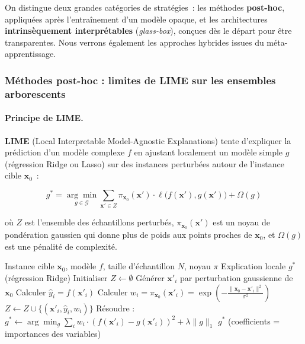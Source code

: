 On distingue deux grandes catégories de stratégies~: les méthodes \textbf{post-hoc},
appliquées après l'entraînement d'un modèle opaque, et les architectures
\textbf{intrinsèquement interprétables} (\textit{glass-box}), conçues dès le départ pour
être transparentes. Nous verrons également les approches hybrides issues du méta-apprentissage.

\subsubsection{Méthodes post-hoc : limites de LIME sur les ensembles arborescents}

\paragraph{Principe de LIME.}
\textbf{LIME} (Local Interpretable Model-Agnostic Explanations) tente d'expliquer la
prédiction d'un modèle complexe $f$ en ajustant localement un modèle simple $g$
(régression Ridge ou Lasso) sur des instances perturbées autour de l'instance cible $\mathbf{x}_0$~:

\begin{equation}
  g^* = \underset{g \in \mathcal{G}}{\arg\min}
  \sum_{\mathbf{x}' \in Z} \pi_{\mathbf{x}_0}(\mathbf{x}') \cdot \ell\bigl(f(\mathbf{x}'), g(\mathbf{x}')\bigr)
  + \Omega(g)
  \label{eq:lime}
\end{equation}

où $Z$ est l'ensemble des échantillons perturbés, $\pi_{\mathbf{x}_0}(\mathbf{x}')$ est un noyau
de pondération gaussien qui donne plus de poids aux points proches de $\mathbf{x}_0$,
et $\Omega(g)$ est une pénalité de complexité.

\begin{algorithm}[H]
\caption{LIME appliqué à un classifieur d'ensemble $f$}
\begin{algorithmic}[1]
\Require Instance cible $\mathbf{x}_0$, modèle $f$, taille d'échantillon $N$, noyau $\pi$
\Ensure Explication locale $g^*$ (régression Ridge)
\State Initialiser $Z \leftarrow \emptyset$
    \State Générer $\mathbf{x}'_i$ par perturbation gaussienne de $\mathbf{x}_0$
    \State Calculer $\hat{y}_i = f(\mathbf{x}'_i)$ 
    \State Calculer $w_i = \pi_{\mathbf{x}_0}(\mathbf{x}'_i) = \exp\!\left(-\frac{\|\mathbf{x}_0 - \mathbf{x}'_i\|^2}{\sigma^2}\right)$
    \State $Z \leftarrow Z \cup \{(\mathbf{x}'_i, \hat{y}_i, w_i)\}$
\EndFor
\State Résoudre : $g^* \leftarrow \arg\min_{g} \sum_{i} w_i \cdot (f(\mathbf{x}'_i) - g(\mathbf{x}'_i))^2 + \lambda\|g\|_1$
\State \Return $g^*$ (coefficients = importances des variables)
\end{algorithmic}
\end{algorithm}

